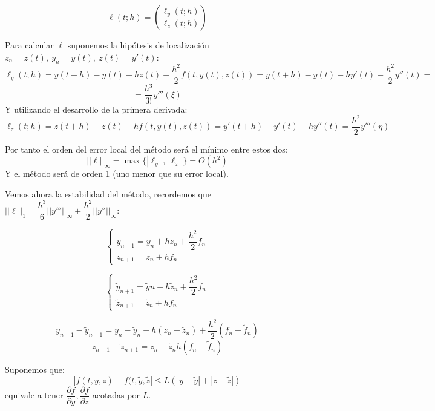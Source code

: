 \documentclass[openany]{book}
\begin{document}
\begin{exercise}

        $$ \ell(t;h) = \binom{\ell_{y}(t;h)}{\ell_{z}(t;h)}  $$
        
        Para calcular $ \ell $ suponemos la hipótesis de localización $ z_n = z(t),\ y_n = y(t),\  z(t) = y'(t)$:
        $$ \ell_{y}(t;h) = y(t+h)-y(t)-hz(t) - \dfrac{h^2}{2}f(t,y(t),z(t)) = y(t+h)-y(t)-hy'(t)-\dfrac{h^2}{2}y''(t) = $$
        $$  = \dfrac{h^3}{3!}y'''(\xi) $$
        Y utilizando el desarrollo de la primera derivada:
        $$ \ell_{z}(t;h) = z(t+h)-z(t)-hf(t,y(t),z(t)) = y'(t+h)-y'(t)-hy''(t) = \dfrac{h^2}{2}y'''(\eta) $$

        Por tanto el orden del error local del método será el mínimo entre estos dos:
        $$ ||\ell||_{\infty} = \max \{|\ell_{y}|,|\ell_{z}|\} = O(h^2)  $$
        Y el método será de orden 1 (uno menor que su error local).

        Vemos ahora la estabilidad del método, recordemos que $ ||\ell||_{1} = \dfrac{h^3}{6}||y'''||_{\infty} + \dfrac{h^2}{2} ||y''||_{\infty} $:

        $$ \left\{
        \begin{array}{l}
            y_{n+1} = y_n +hz_n +\dfrac{h^2}{2}f_n\\
            z_{n+1} = z_n+hf_n
        \end{array}
        \right. $$

        $$ \left\{
            \begin{array}{l}
                \tilde{y}_{n+1} = \tilde{y}n +h\tilde{z}_n +\dfrac{h^2}{2}f_n\\
                \tilde{z}_{n+1} = \tilde{z}_n+hf_n
            \end{array}
            \right. $$
        
            $$ y_{n+1}-\widetilde{y}_{n+1} = y_n-\widetilde{y}_{n} + h(z_n-\widetilde{z}_{n}) + \dfrac{h^2}{2}(f_n-\widetilde{f}_{n})$$
            $$ z_{n+1}-\widetilde{z}_{n+1} = z_n-\widetilde{z}_{n}h(f_n-\widetilde{f}_{n}) $$

            Suponemos que:
            $$ |f(t,y,z)-f(t,\widetilde{y},\widetilde{z}| \leq L(|y-\widetilde{y}|+ |z-\widetilde{z}|) $$
            equivale a tener $ \dfrac{\partial f}{\partial y}, \dfrac{\partial f}{\partial z} $ acotadas por $ L $.


\end{exercise}
\end{document}
